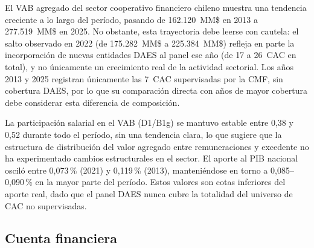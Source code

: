 El VAB agregado del sector cooperativo financiero chileno muestra
una tendencia creciente a lo largo del período, pasando de
162.120~MM\$ en 2013 a 277.519~MM\$ en 2025. No obstante, esta
trayectoria debe leerse con cautela: el salto observado en 2022
(de 175.282~MM\$ a 225.384~MM\$) refleja en parte la
incorporación de nuevas entidades DAES al panel ese año (de 17
a 26~CAC en total), y no únicamente un crecimiento real de la
actividad sectorial. Los años 2013 y 2025 registran únicamente
las 7~CAC supervisadas por la CMF, sin cobertura DAES, por lo
que su comparación directa con años de mayor cobertura debe
considerar esta diferencia de composición.

La participación salarial en el VAB (D1/B1g) se mantuvo
estable entre 0{,}38 y 0{,}52 durante todo el período, sin
una tendencia clara, lo que sugiere que la estructura de
distribución del valor agregado entre remuneraciones y
excedente no ha experimentado cambios estructurales en el
sector. El aporte al PIB nacional osciló entre 0,073\,\%
(2021) y 0,119\,\% (2013), manteniéndose en torno a
0,085--0,090\,\% en la mayor parte del período. Estos valores
son cotas inferiores del aporte real, dado que el panel DAES
nunca cubre la totalidad del universo de CAC no supervisadas.

\subsection{Cuenta financiera}
\label{subsec:financiera-total}

